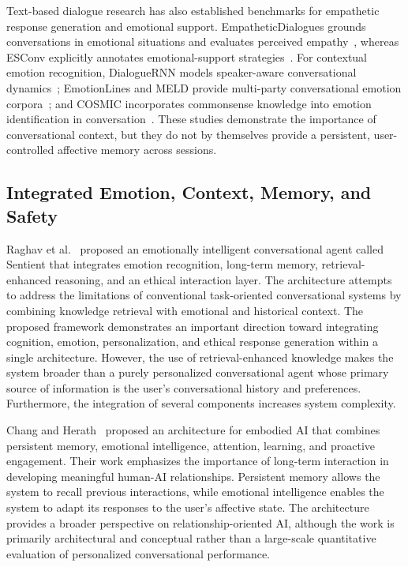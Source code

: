 \documentclass[graybox]{svmult}
\begin{document}
Text-based dialogue research has also established benchmarks for empathetic response generation and emotional support. EmpatheticDialogues grounds conversations in emotional situations and evaluates perceived empathy~\cite{rashkin2019empathetic}, whereas ESConv explicitly annotates emotional-support strategies~\cite{liu2021esconv}. For contextual emotion recognition, DialogueRNN models speaker-aware conversational dynamics~\cite{majumder2019dialoguernn}; EmotionLines and MELD provide multi-party conversational emotion corpora~\cite{chen2018emotionlines,poria2019meld}; and COSMIC incorporates commonsense knowledge into emotion identification in conversation~\cite{ghosal2020cosmic}. These studies demonstrate the importance of conversational context, but they do not by themselves provide a persistent, user-controlled affective memory across sessions.

\subsection{Integrated Emotion, Context, Memory, and Safety}

Raghav et al.~\cite{Raghav2026} proposed an emotionally intelligent conversational agent called Sentient that integrates emotion recognition, long-term memory, retrieval-enhanced reasoning, and an ethical interaction layer. The architecture attempts to address the limitations of conventional task-oriented conversational systems by combining knowledge retrieval with emotional and historical context. The proposed framework demonstrates an important direction toward integrating cognition, emotion, personalization, and ethical response generation within a single architecture. However, the use of retrieval-enhanced knowledge makes the system broader than a purely personalized conversational agent whose primary source of information is the user's conversational history and preferences. Furthermore, the integration of several components increases system complexity.

Chang and Herath~\cite{ChangHerath2025} proposed an architecture for embodied AI that combines persistent memory, emotional intelligence, attention, learning, and proactive engagement. Their work emphasizes the importance of long-term interaction in developing meaningful human-AI relationships. Persistent memory allows the system to recall previous interactions, while emotional intelligence enables the system to adapt its responses to the user's affective state. The architecture provides a broader perspective on relationship-oriented AI, although the work is primarily architectural and conceptual rather than a large-scale quantitative evaluation of personalized conversational performance.
\end{document}
